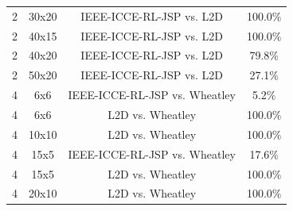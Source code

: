 \begin{table}
\begin{tabular}{cccc}
        2 & 30x20 & IEEE-ICCE-RL-JSP vs. L2D & 100.0$\%$ \\
        2 & 40x15 & IEEE-ICCE-RL-JSP vs. L2D & 100.0$\%$ \\
        2 & 40x20 & IEEE-ICCE-RL-JSP vs. L2D & 79.8$\%$ \\
        2 & 50x20 & IEEE-ICCE-RL-JSP vs. L2D & 27.1$\%$ \\\hline
        4 & 6x6 & IEEE-ICCE-RL-JSP vs. Wheatley & 5.2$\%$ \\
        4 & 6x6 & L2D vs. Wheatley & 100.0$\%$ \\
        4 & 10x10 & L2D vs. Wheatley & 100.0$\%$ \\
        4 & 15x5 & IEEE-ICCE-RL-JSP vs. Wheatley & 17.6$\%$ \\
        4 & 15x5 & L2D vs. Wheatley & 100.0$\%$ \\
        4 & 20x10 & L2D vs. Wheatley & 100.0$\%$ \\
        \bottomrule
    \end{tabular}      
\end{table}